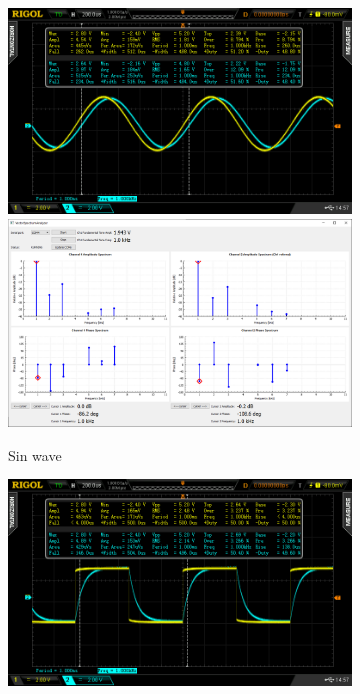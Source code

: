 \documentclass[notitlepage, a4paper, 11pt]{article}
\begin{document}
		\begin{figure}[H]
		\centering
		
		\begin{subfigure}[][][t]{0.23\textwidth}
			\includegraphics[width=\textwidth, trim=85 50 112 45, clip]{../img/osc/DS2_QuickPrint5.png}
			\includegraphics[width=\textwidth, trim=10 80 555 100, clip]{../img/Circuit1/sin}
			\caption{Sin wave}
		\end{subfigure}
		\hfill
		\begin{subfigure}[][][t]{0.23\textwidth}
			\includegraphics[width=\textwidth, trim=85 50 112 45, clip]{../img/osc/DS2_QuickPrint4.png}

\end{subfigure}
\end{figure}
\end{document}

